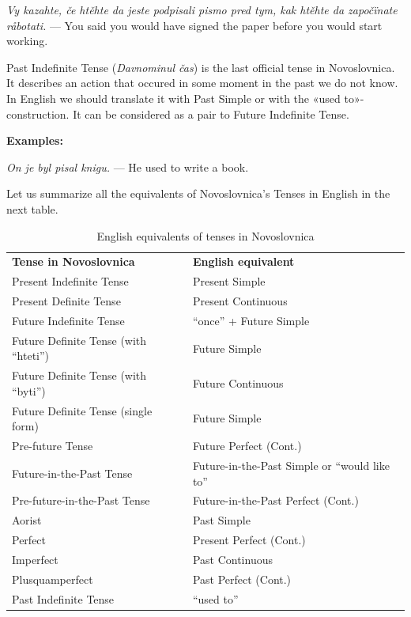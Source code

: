\textit{Vy kazahte, če htěhte da jeste podpisali pismo pred tym, kak htěhte da započïnate råbotati.} — You said you would have signed the paper before you would start working.

Past Indefinite Tense (\textit{Davnominul čas}) is the last official tense in Novoslovnica. It describes an action that occured in some moment in the past we do not know. In English we should translate it with Past Simple or with the «used to»-construction. It can be considered as a pair to Future Indefinite Tense.

\textbf{Examples:}

\textit{On je byl pisal knigu.} — He used to write a book.

Let us summarize all the equivalents of Novoslovnica's Tenses in English in the next table.

\begin{table}
	\caption{English equivalents of tenses in Novoslovnica}
	\begin{tabular}{ p{11em} p{11em} }
		\textbf{Tense in Novoslovnica}       & \textbf{English equivalent}                  \\
		Present Indefinite Tense             & Present Simple                               \\
		Present Definite Tense               & Present Continuous                           \\
		Future Indefinite Tense              & “once” + Future Simple                       \\
		Future Definite Tense (with “hteti”) & Future Simple                                \\
		Future Definite Tense (with “byti”)  & Future Continuous                            \\
		Future Definite Tense (single form)  & Future Simple                                \\
		Pre-future Tense                     & Future Perfect (Cont.)                       \\
		Future-in-the-Past Tense             & Future-in-the-Past Simple or “would like to” \\
		Pre-future-in-the-Past Tense         & Future-in-the-Past Perfect (Cont.)           \\
		Aorist                               & Past Simple                                  \\
		Perfect                              & Present Perfect (Cont.)                      \\
		Imperfect                            & Past Continuous                              \\
		Plusquamperfect                      & Past Perfect (Cont.)                         \\
		Past Indefinite Tense                & “used to”                                    
	\end{tabular}
\end{table}


